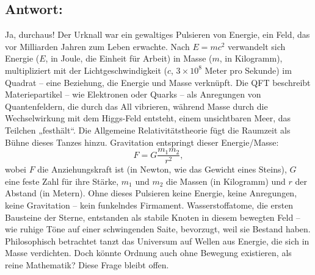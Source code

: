 \documentclass{article}
\begin{document}
	\subsection*{Antwort:}
	Ja, durchaus! Der Urknall war ein gewaltiges Pulsieren von Energie, ein Feld, das vor Milliarden Jahren zum Leben erwachte. Nach $E = mc^2$ verwandelt sich Energie ($E$, in Joule, die Einheit für Arbeit) in Masse ($m$, in Kilogramm), multipliziert mit der Lichtgeschwindigkeit ($c$, $3 \times 10^8$ Meter pro Sekunde) im Quadrat – eine Beziehung, die Energie und Masse verknüpft. Die QFT beschreibt Materiepartikel – wie Elektronen oder Quarks – als Anregungen von Quantenfeldern, die durch das All vibrieren, während Masse durch die Wechselwirkung mit dem Higgs-Feld entsteht, einem unsichtbaren Meer, das Teilchen „festhält“. Die Allgemeine Relativitätstheorie fügt die Raumzeit als Bühne dieses Tanzes hinzu. Gravitation entspringt dieser Energie/Masse:
	\begin{equation}
		F = G \frac{m_1 m_2}{r^2},
	\end{equation}
	wobei $F$ die Anziehungskraft ist (in Newton, wie das Gewicht eines Steins), $G$ eine feste Zahl für ihre Stärke, $m_1$ und $m_2$ die Massen (in Kilogramm) und $r$ der Abstand (in Metern). Ohne dieses Pulsieren keine Energie, keine Anregungen, keine Gravitation – kein funkelndes Firmament. Wasserstoffatome, die ersten Bausteine der Sterne, entstanden als stabile Knoten in diesem bewegten Feld – wie ruhige Töne auf einer schwingenden Saite, bevorzugt, weil sie Bestand haben. Philosophisch betrachtet tanzt das Universum auf Wellen aus Energie, die sich in Masse verdichten. Doch könnte Ordnung auch ohne Bewegung existieren, als reine Mathematik? Diese Frage bleibt offen.
	
\end{document}
